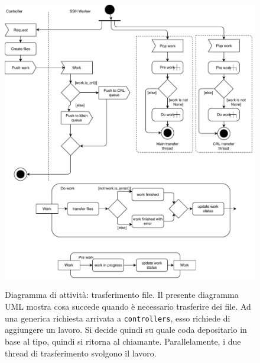 \inputminted[tabsize=4, breaklines, fontsize=\footnotesize]{lua}{code_samples/works.lua}

\begin{figure}
	\includegraphics[scale=0.5]{img/activity_generic_file_transfer}
	\label{fig:activity-generic-file-transfer}
	\caption[Diagramma di attività: trasferimento file]{Diagramma di attività:
		trasferimento file. Il presente diagramma UML mostra cosa succede quando è necessario
		trasferire dei file. Ad una generica richiesta arrivata a \texttt{controllers},
		esso richiede di aggiungere un lavoro. Si decide quindi su quale coda
		depositarlo in base al tipo, quindi si ritorna al chiamante.
	Parallelamente, i due thread di trasferimento svolgono il lavoro.}
\end{figure}


